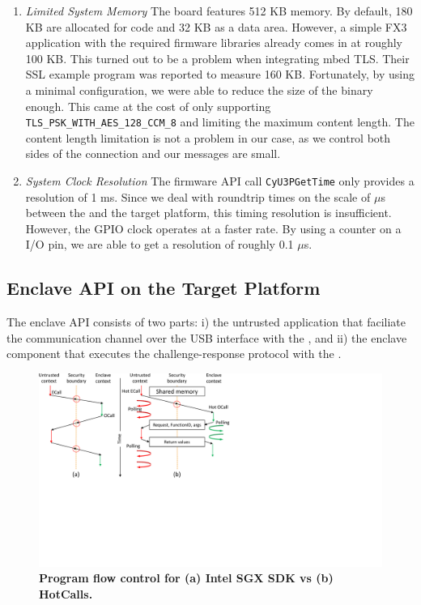 \begin{enumerate}
  \item \emph{Limited System Memory} The board features 512 KB memory. By default, 180 KB are allocated for code and 32 KB as a data area. However, a simple FX3 application with the required firmware libraries already comes in at roughly 100 KB. This turned out to be a problem when integrating mbed TLS. Their SSL example program was reported to measure 160 KB. Fortunately, by using a minimal configuration, we were able to reduce the size of the binary enough. This came at the cost of only supporting \texttt{TLS\_PSK\_WITH\_AES\_128\_CCM\_8} and limiting the maximum content length. The content length limitation is not a problem in our case, as we control both sides of the connection and our messages are small.

 \item \emph{System Clock Resolution} The firmware API call \texttt{CyU3PGetTime} only provides a resolution of 1 ms. Since we deal with roundtrip times on the scale of $\mu$s between the \device and the target platform, this timing resolution is insufficient. However, the GPIO clock operates at a faster rate. By using a counter on a I/O pin, we are able to get a resolution of roughly 0.1 $\mu$s.
  
\end{enumerate}

\subsection{\name Enclave API on the Target Platform} 

The \name enclave API consists of two parts: i) the untrusted application that faciliate the communication channel over the USB interface with the \device, and ii) the enclave component that executes the challenge-response protocol with the \device.

\begin{figure}[t]
  \centering
    \includegraphics[trim={0 9cm 15cm 0}, clip, width=\linewidth]{chapters/ProximiTEE/images_new/hotcalls.pdf}
    \caption[Program flow control for Intel SGX SDK vs HotCalls]{\textbf{Program flow control for (a) Intel SGX SDK vs (b) HotCalls.} }
    \label{fig:hotcalls}
\end{figure}

